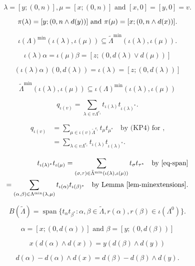 \documentclass[a4paper,12pt]{article}
\begin{document}
\[
 \lambda = [y;(0,n)],
\mu = [x;(0,n)] \text{ and }
[x,0]=[y,0] = v.\]

\[ \pi(\lambda) = [y; (0, n \wedge d(y))] \text{ and }\\
\pi(\mu) = [x;(0, n \wedge d(x))].
\]

\[\iota(\Lambda)^{\min}(\iota(\lambda),\iota(\mu))
 \subseteq \tilde\Lambda^{\min}(\iota(\lambda),\iota(\mu)).\]

\[\iota(\lambda)\alpha = \iota(\mu)\beta = [z;(0,d(\lambda) \vee d(\mu))]\]

\[
    (\iota(\lambda)\alpha)(0,d(\lambda)) = \iota(\lambda) = [z;(0,d(\lambda))]
   \]

\[\tilde\Lambda^{\min}(\iota(\lambda),\iota(\mu)) \subseteq \iota(\Lambda)^{\min}(\iota(\lambda),\iota(\mu))\]

\begin{equation*}\label{eq-kp4alt}q_{\iota(v)} = \sum_{\lambda \in v\Lambda^{e_i}} t_{\iota(\lambda)}t_{\iota(\lambda)^*}.
\end{equation*}

\begin{align*}
q_{\iota(v)}&= \sum_{\mu \in \iota(v) {\tilde{\Lambda}}^{e_i}} t_\mu t_{\mu^*} 
\quad \text{by (KP4) for ,}\\
&= \sum_{\lambda \in v\Lambda^{e_i}} t_{\iota(\lambda)}t_{\iota(\lambda)^*}.
\end{align*}

\begin{align*}
t_{\iota(\lambda)^{*}}t_{\iota(\mu)}=
\sum_{(\sigma,\tau)\in\tilde\Lambda^{\min}(\iota(\lambda),\iota(\mu))}
t_{\sigma} t_{\tau^*} \text{\quad by \eqref{eq-span}}\\
=\sum_{(\alpha,\beta)\in\Lambda^{\min}(\lambda,\mu)}
t_{\iota(\alpha)} t_{\iota(\beta)^*} \text{\quad by Lemma~\ref{lem-minextensions}.}
\end{align*}

\[B(\tilde\Lambda) = {\operatorname{\mathrm{span}}}\{t_{\alpha}t_{\beta^*} : \alpha, \beta \in \tilde{\Lambda},
 r(\alpha),r(\beta) \in \iota(\Lambda^0)\}.\]

\[
 \alpha = [x;(0,d(\alpha))] \text{ and }
\beta = [y;(0,d(\beta))]
\]

\begin{equation}
 \label{eq:alpha_beta_v1}
x(d(\alpha) \wedge d(x)) = y(d(\beta) \wedge d(y))
\end{equation}

\begin{equation}
 \label{eq:alphabeta_v2}
d(\alpha)-d(\alpha) \wedge d(x) = d(\beta) -d(\beta) \wedge d(y).
\end{equation}
\end{document}
